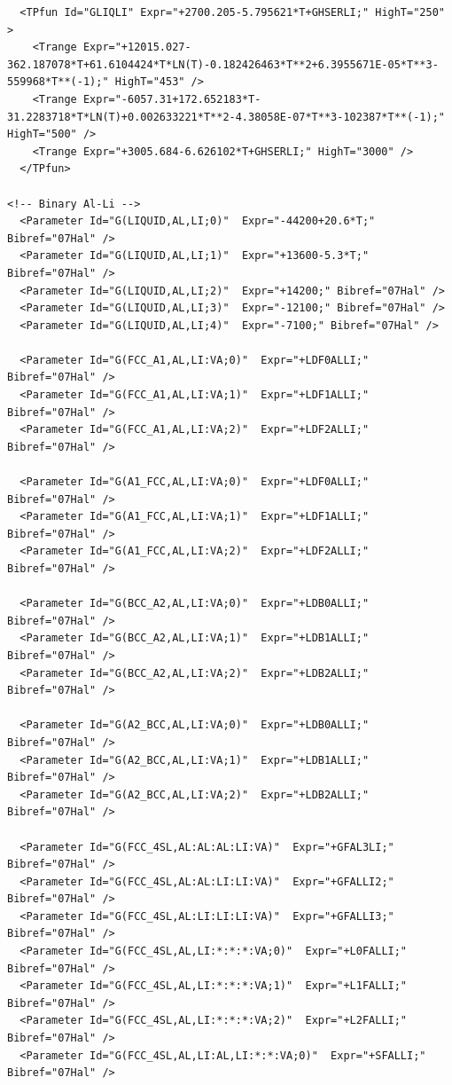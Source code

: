 \documentclass{article}
\begin{document}
\begin{appendices}
\begin{verbatim}
  <TPfun Id="GLIQLI" Expr="+2700.205-5.795621*T+GHSERLI;" HighT="250" >
    <Trange Expr="+12015.027-362.187078*T+61.6104424*T*LN(T)-0.182426463*T**2+6.3955671E-05*T**3-559968*T**(-1);" HighT="453" /> 
    <Trange Expr="-6057.31+172.652183*T-31.2283718*T*LN(T)+0.002633221*T**2-4.38058E-07*T**3-102387*T**(-1);" HighT="500" /> 
    <Trange Expr="+3005.684-6.626102*T+GHSERLI;" HighT="3000" /> 
  </TPfun>

<!-- Binary Al-Li -->
  <Parameter Id="G(LIQUID,AL,LI;0)"  Expr="-44200+20.6*T;" Bibref="07Hal" />
  <Parameter Id="G(LIQUID,AL,LI;1)"  Expr="+13600-5.3*T;" Bibref="07Hal" />
  <Parameter Id="G(LIQUID,AL,LI;2)"  Expr="+14200;" Bibref="07Hal" />
  <Parameter Id="G(LIQUID,AL,LI;3)"  Expr="-12100;" Bibref="07Hal" />
  <Parameter Id="G(LIQUID,AL,LI;4)"  Expr="-7100;" Bibref="07Hal" />

  <Parameter Id="G(FCC_A1,AL,LI:VA;0)"  Expr="+LDF0ALLI;" Bibref="07Hal" />
  <Parameter Id="G(FCC_A1,AL,LI:VA;1)"  Expr="+LDF1ALLI;" Bibref="07Hal" />
  <Parameter Id="G(FCC_A1,AL,LI:VA;2)"  Expr="+LDF2ALLI;" Bibref="07Hal" />

  <Parameter Id="G(A1_FCC,AL,LI:VA;0)"  Expr="+LDF0ALLI;" Bibref="07Hal" />
  <Parameter Id="G(A1_FCC,AL,LI:VA;1)"  Expr="+LDF1ALLI;" Bibref="07Hal" />
  <Parameter Id="G(A1_FCC,AL,LI:VA;2)"  Expr="+LDF2ALLI;" Bibref="07Hal" />

  <Parameter Id="G(BCC_A2,AL,LI:VA;0)"  Expr="+LDB0ALLI;" Bibref="07Hal" />
  <Parameter Id="G(BCC_A2,AL,LI:VA;1)"  Expr="+LDB1ALLI;" Bibref="07Hal" />
  <Parameter Id="G(BCC_A2,AL,LI:VA;2)"  Expr="+LDB2ALLI;" Bibref="07Hal" />

  <Parameter Id="G(A2_BCC,AL,LI:VA;0)"  Expr="+LDB0ALLI;" Bibref="07Hal" />
  <Parameter Id="G(A2_BCC,AL,LI:VA;1)"  Expr="+LDB1ALLI;" Bibref="07Hal" />
  <Parameter Id="G(A2_BCC,AL,LI:VA;2)"  Expr="+LDB2ALLI;" Bibref="07Hal" />

  <Parameter Id="G(FCC_4SL,AL:AL:AL:LI:VA)"  Expr="+GFAL3LI;" Bibref="07Hal" />
  <Parameter Id="G(FCC_4SL,AL:AL:LI:LI:VA)"  Expr="+GFALLI2;" Bibref="07Hal" />
  <Parameter Id="G(FCC_4SL,AL:LI:LI:LI:VA)"  Expr="+GFALLI3;" Bibref="07Hal" />
  <Parameter Id="G(FCC_4SL,AL,LI:*:*:*:VA;0)"  Expr="+L0FALLI;" Bibref="07Hal" />
  <Parameter Id="G(FCC_4SL,AL,LI:*:*:*:VA;1)"  Expr="+L1FALLI;" Bibref="07Hal" />
  <Parameter Id="G(FCC_4SL,AL,LI:*:*:*:VA;2)"  Expr="+L2FALLI;" Bibref="07Hal" />
  <Parameter Id="G(FCC_4SL,AL,LI:AL,LI:*:*:VA;0)"  Expr="+SFALLI;" Bibref="07Hal" />


\end{verbatim}
\end{appendices}
\end{document}
